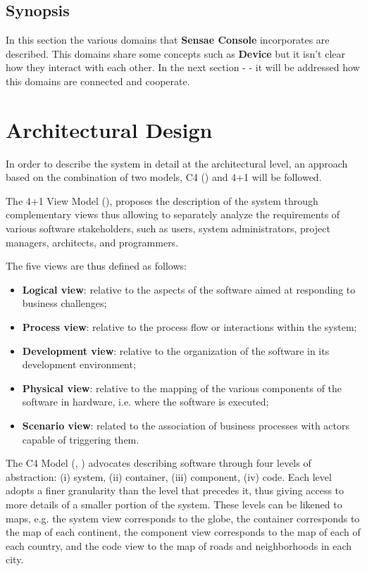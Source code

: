 \subsection{Synopsis}
\label{subsec:design:domain:synopsis}

In this section the various domains that \textbf{Sensae Console} incorporates are described. This domains share some concepts such as \textbf{Device} but it isn't clear how they interact with each other. In the next section -  - it will be addressed how this domains are connected and cooperate.

\section{Architectural Design}
\label{sec:design:architecture}

In order to describe the system in detail at the architectural level, an approach based on the combination of two models, C4 (\cite{c4model-site}) and 4+1  will be followed.

The 4+1 View Model (\cite{4plus1model}), proposes the description of the system through complementary views thus allowing to separately analyze the requirements of various software stakeholders, such as users, system administrators, project managers, architects, and programmers.

The five views are thus defined as follows:
\begin{itemize}
   \item \textbf{Logical view}: relative to the aspects of the software aimed at responding to business challenges;
   \item \textbf{Process view}: relative to the process flow or interactions within the system;
   \item \textbf{Development view}: relative to the organization of the software in its development environment;
   \item \textbf{Physical view}: relative to the mapping of the various components of the software in hardware, i.e. where the software is executed;
   \item \textbf{Scenario view}: related to the association of business processes with actors capable of triggering them.
\end{itemize}

The C4 Model (\cite{c4model-site}, \cite{c4model}) advocates describing software through four levels of abstraction:
(i) system, (ii) container, (iii) component, (iv) code. Each level adopts a finer granularity than the level that precedes it, thus giving access to more details of a smaller portion of the system.
These levels can be likened to maps, e.g. the system view corresponds to the globe, the container corresponds to the map of each continent, the component view corresponds to the map of each of each country, and the code view to the map of roads and neighborhoods in each city.

